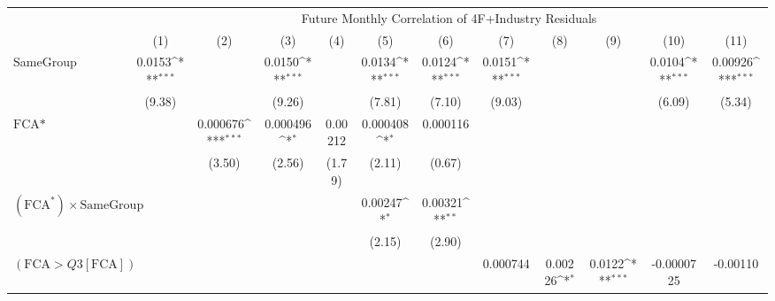 {
\def\sym#1{\ifmmode^{#1}\else\(^{#1}\)\fi}
\begin{tabular}{l*{11}{c}}
\hline\hline
                &\multicolumn{11}{c}{Future Monthly Correlation of 4F+Industry Residuals}                                                                                                                                        \\\cmidrule(lr){2-12}
                &\multicolumn{1}{c}{(1)}         &\multicolumn{1}{c}{(2)}         &\multicolumn{1}{c}{(3)}         &\multicolumn{1}{c}{(4)}         &\multicolumn{1}{c}{(5)}         &\multicolumn{1}{c}{(6)}         &\multicolumn{1}{c}{(7)}         &\multicolumn{1}{c}{(8)}         &\multicolumn{1}{c}{(9)}         &\multicolumn{1}{c}{(10)}         &\multicolumn{1}{c}{(11)}         \\
\hline
SameGroup       &   0.0153\sym{***}&                  &   0.0150\sym{***}&                  &   0.0134\sym{***}&   0.0124\sym{***}&   0.0151\sym{***}&                  &                  &   0.0104\sym{***}&  0.00926\sym{***}\\
                &   (9.38)         &                  &   (9.26)         &                  &   (7.81)         &   (7.10)         &   (9.03)         &                  &                  &   (6.09)         &   (5.34)         \\
[1em]
$ \text{FCA*} $ &                  & 0.000676\sym{***}& 0.000496\sym{*}  &  0.00212         & 0.000408\sym{*}  & 0.000116         &                  &                  &                  &                  &                  \\
                &                  &   (3.50)         &   (2.56)         &   (1.79)         &   (2.11)         &   (0.67)         &                  &                  &                  &                  &                  \\
[1em]
 $ (\text{FCA}^*) \times {\text{SameGroup} }  $ &                  &                  &                  &                  &  0.00247\sym{*}  &  0.00321\sym{**} &                  &                  &                  &                  &                  \\
                &                  &                  &                  &                  &   (2.15)         &   (2.90)         &                  &                  &                  &                  &                  \\
[1em]
 $ (\text{FCA} > Q3[\text{FCA}]) $ &                  &                  &                  &                  &                  &                  & 0.000744         &  0.00226\sym{*}  &   0.0122\sym{***}&-0.0000725         & -0.00110         \\

\end{tabular}}
